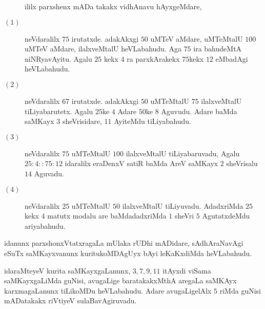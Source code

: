\begin{description}
  ililx parxshenx mADa takakx vidhAnavu hAyxgeMdare,

\item[$(1)$] neVdaralilx $75$ irutatxde. adakAkxgi $50$ uMTeV aMdare,
uMTeMtalU $100$ uMTeV aMdare, ilalxveMtalU heVLabahudu. Aga $75$ ira
bahudeMtA niNRyavAyitu. Agalu $25$ kekx $4$ ra parxkArakekx $75$kekx
$12$ eMbadAgi heVLabahudu.

\item[$(2)$] neVdaralilx $67$ irutatxde. adakAkxgi $50$ uMTeMtalU $75$
ilalxveMtalU tiLiyabarutetx. Agalu $25$ke $4$ Adare $50$ke $8$
Aguvudu. Adare baMda saMKayx $3$ sheVrisidare, $11$ AyiteMdu
tiLiyabahudu.

\item[$(3)$] neVdaralilx $75$ uMTeMtalU $100$ ilalxveMtalU
tiLiyabaruvadu, Agalu $25: 4 :: 75:12$ idaralilx eraDenxV satiR baMda
AreV saMKayx $2$ sheVrisalu $14$ Aguvadu.

\item[$(4)$] neVdaralilx $25$ uMTeMtalU $50$ ilalxveMtalU
tiLiyuvadu. AdadxriMda $25$ kekx $4$ matutx modalu are baMdadadxriMda
$1$ sheVri $5$ AgutatxdeMdu ariyabahudu.
\end{description}

idanunx parxshonxVtatxragaLa mUlaka rUDhi mADidare, sAdhAraNavAgi
eSuTx saMKayxvanunx kuritukoMDAgUyx bAyi leKaKxdiMda heVLabahudu.

idaraMteyeV kurita saMKayxgaLanunx, $3, 7, 9, 11$ itAyxdi viSama
saMKayxgaLiMda guNisi, avugaLige baratakakxMthA aregaLa saMKAyx
karxmagaLanunx tiLikoMDu heVLabahudu. Adare avugaLigelAlx $5$ riMda
guNisi mADatakakx riVtiyeV sulaBavAgiruvadu.
